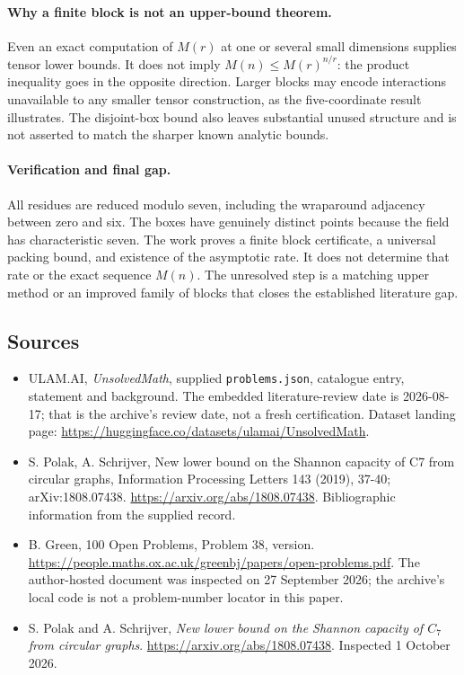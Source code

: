\documentclass[11pt,a4paper]{article}
\begin{document}
\paragraph{Why a finite block is not an upper-bound theorem.}
Even an exact computation of $M(r)$ at one or several small dimensions supplies tensor lower bounds. It does not imply $M(n)\leq M(r)^{n/r}$: the product inequality goes in the opposite direction. Larger blocks may encode interactions unavailable to any smaller tensor construction, as the five-coordinate result illustrates. The disjoint-box bound also leaves substantial unused structure and is not asserted to match the sharper known analytic bounds.

\paragraph{Verification and final gap.}
All residues are reduced modulo seven, including the wraparound adjacency between zero and six. The boxes have genuinely distinct points because the field has characteristic seven. The work proves a finite block certificate, a universal packing bound, and existence of the asymptotic rate. It does not determine that rate or the exact sequence $M(n)$. The unresolved step is a matching upper method or an improved family of blocks that closes the established literature gap.

\subsection{Sources}

{\small

\begin{itemize}

\item[\hypertarget{source:statement:1}{S1}] ULAM.AI, \emph{UnsolvedMath}, supplied \texttt{problems.json}, catalogue entry, statement and background. The embedded literature-review date is 2026-08-17; that is the archive’s review date, not a fresh certification. Dataset landing page: \url{https://huggingface.co/datasets/ulamai/UnsolvedMath}.

\item[\hypertarget{source:statement:2}{S2}] S. Polak, A. Schrijver, New lower bound on the Shannon capacity of C7 from circular graphs, Information Processing Letters 143 (2019), 37-40; arXiv:1808.07438. \url{https://arxiv.org/abs/1808.07438}. Bibliographic information from the supplied record.

\item[\hypertarget{source:statement:3}{S3}] B. Green, 100 Open Problems, Problem 38, version. \url{https://people.maths.ox.ac.uk/greenbj/papers/open-problems.pdf}. The author-hosted document was inspected on 27 September 2026; the archive’s local code is not a problem-number locator in this paper.

\item[E1] S. Polak and A. Schrijver, \emph{New lower bound on the Shannon capacity of $C_7$ from circular graphs}. \url{https://arxiv.org/abs/1808.07438}. Inspected 1 October 2026.

\end{itemize}

}

\label{end:statement}
\end{document}
